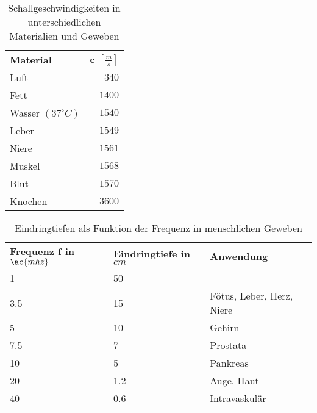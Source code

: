 \begin{comment}
\section{\acs{emi} und mixed-Signal \acs{pcb}}

Die symmetrische Signalübertragung (Störfestigkeit) Seite 140f.
ab 500 \ac{mhz} trägt das filterlayout bei (S190) -> Filterlayout vernachlässigbar
Seite 235 - Kleinrechner boards pi filter..

Gegentakt / Gleichtaktstörungen
Galvanische Kopplung und Gegenmaßnahmen
Kapazitive Kopplung und Gegenmaßnahmen
Induktive Kopplung und Gegenmaßnahmen
Filter
Filterschaltungen (Seite 127f.)
Prinzip, Tiefpass, 
\end{comment}



%
%
%
%
%
%
%
%
\begin{table}[h!t]
\centering
\caption{Schallgeschwindigkeiten in unterschiedlichen Materialien und Geweben}
\label{tab:Schallgeschwindigkeiten}
\begin{tabular}{l|r}
\textbf{Material} & \textbf{c $\left[\frac{m}{s}\right]$} \\
\cline{1-2}
Luft 				  & $340$	 \\ 
Fett 				  & $1400$	 \\ 
Wasser $(37^\circ C)$ & $1540$	 \\ 
Leber 				  & $1549$ 	 \\ 
Niere 				  & $1561$ 	 \\ 
Muskel 				  & $1568$ 	 \\ 
Blut 				  & $1570$ 	 \\ 
Knochen 			  & $3600$ 	 \\ 
\end{tabular}
\end{table}
\begin{table}[h!t]
\centering
\caption{Eindringtiefen als Funktion der Frequenz in menschlichen Geweben}
\label{tab:Eindringtiefen}
\begin{tabular}{l|l|l}
\textbf{Frequenz f in $\ac{mhz}$} & \textbf{Eindringtiefe in $cm$} & \textbf{Anwendung} \\
\cline{1-3}
1 	& 50	& 	 \\ 
3.5 & 15	& Fötus, Leber, Herz, Niere	 \\ 
5 	& 10	& Gehirn \\ 
7.5 & 7 	& Prostata \\ 
10 	& 5 	& Pankreas \\ 
20 	& 1.2 	& Auge, Haut \\ 
40 	& 0.6 	& Intravaskulär \\ 
\end{tabular}
\end{table}
